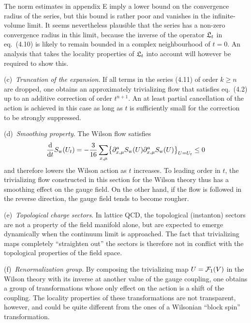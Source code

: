The norm estimates in appendix E imply a lower bound on
the convergence radius of the series, but this bound
is rather poor and vanishes in the infinite-volume limit.
It seems nevertheless plausible that
the series has a non-zero convergence radius
in this limit,
because the inverse of the operator $\mathfrak{L}_t$
in eq.~(4.10) is likely to remain bounded
in a complex neighbourhood of $t=0$.
An analysis that
takes the locality properties of $\mathfrak{L}_t$
into account will however be required to show this.

\smallskip
\noindent
(c)~{\itshape Truncation of the expansion}.
If all terms in the series (4.11) of order $k\geq n$ are dropped,
one obtains an approximately trivializing flow that
satisfies eq.~(4.2) up to an additive correction
of order $t^{n+1}$.
An at least partial cancellation of the action is
achieved in this case as long as $t$ is
sufficiently small for the correction
to be strongly suppressed.

\smallskip
\noindent
(d)~{\itshape Smoothing property}.
The Wilson flow satisfies
\begin{equation}
  {\mathrm{d}\over\mathrm{d}t}S_{\mathrm{w}}(U_t)=-\frac{3}{16}\sum_{x,\mu}
  \bigl\{\partial^a_{x,\mu}S_{\mathrm{w}}(U)
  \partial^a_{x,\mu}S_{\mathrm{w}}(U)\bigr\}_{U=U_t}\leq 0
\end{equation}
and therefore lowers the Wilson action as $t$ increases.
To leading order in $t$, the trivializing flow
constructed in this section for the Wilson theory thus
has a smoothing effect on the gauge field.
On the other hand, if the flow is followed in the reverse
direction, the gauge field tends to become rougher.

\smallskip
\noindent
(e)~{\itshape Topological charge sectors}.
In lattice QCD, the topological (instanton)
sectors are not a property of the field manifold alone, but
are expected to emerge dynamically when the continuum limit is approached.
The fact that trivializing maps completely ``straighten out''
the sectors is therefore not in conflict with the topological
properties of the field space.

\smallskip
\noindent
(f)~{\itshape Renormalization group}.
By composing the trivializing map $U=\mathcal{F}_1(V)$
in the Wilson theory
with its inverse at another value of the gauge coupling,
one obtains a group of transformations whose only effect
on the action is a shift of the coupling.
The locality properties of these transformations are
not transparent, however, and could be quite different from the ones
of a Wilsonian ``block spin'' transformation.

